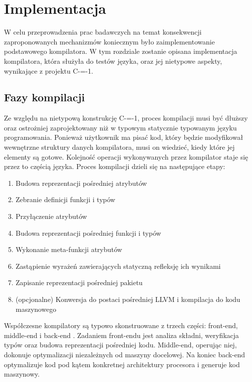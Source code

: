 \section{Implementacja}
\label{implementation}
W celu przeprowadzenia prac badawczych na temat konsekwencji zaproponowanych mechanizmów koniecznym było zaimplementowanie podstawowego kompilatora. 
W tym rozdziale zostanie opisana implementacja kompilatora, która służyła do testów języka, oraz jej nietypowe aspekty, wynikające z projektu C-=-1.

\subsection{Fazy kompilacji}
\label{Compilation_phases}
Ze względu na nietypową konstrukcję C-=-1, proces kompilacji musi być dłuższy oraz ostrożniej zaprojektowany niż w typowym statycznie typowanym języku programowania.
Ponieważ użytkownik ma pisać kod, który będzie modyfikował wewnętrzne struktury danych kompilatora, musi on wiedzieć, kiedy które jej elementy są gotowe.
Kolejność operacji wykonywanych przez kompilator staje się przez to częścią języka.
Proces kompilacji dzieli się na następujące etapy:
\begin{enumerate}
    \item Budowa reprezentacji pośredniej atrybutów
    \item Zebranie definicji funkcji i typów
    \item\label{compilation_step:attribute_attachment} Przyłączenie atrybutów
    \item Budowa reprezentacji pośredniej funkcji i typów
    \item Wykonanie meta-funkcji atrybutów
    \item Zastąpienie wyrażeń zawierających statyczną refleksję ich wynikami
    \item Zapisanie reprezentacji pośredniej pakietu
    \item (opcjonalne) Konwersja do postaci pośredniej LLVM i kompilacja do kodu maszynowego
\end{enumerate}

Współczesne kompilatory są typowo skonstruowane z trzech części: front-end, middle-end i back-end \cite{intro_to_compiler_design}.
Zadaniem front-endu jest analiza składni, weryfikacja typów oraz budowa reprezentacji pośredniej kodu. Middle-end, operując niej, dokonuje optymalizacji niezależnych od maszyny docelowej.
Na koniec back-end optymalizuje kod pod kątem konkretnej architektury procesora i generuje kod maszynowy.

